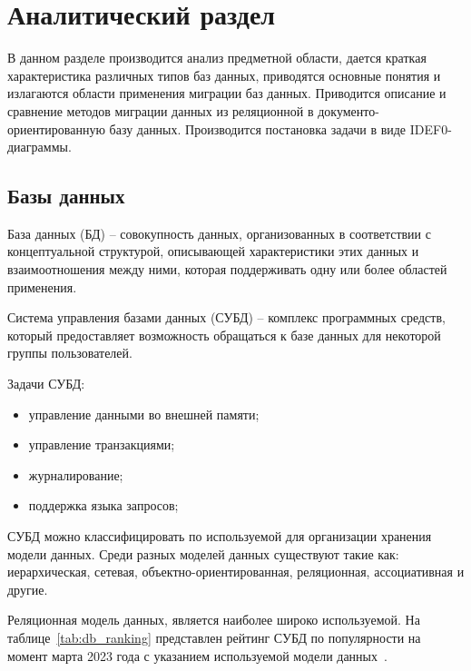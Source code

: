 \chapter{Аналитический раздел}

В данном разделе производится анализ предметной области, 
дается краткая характеристика различных типов баз данных,
приводятся основные понятия и излагаются области применения миграции баз данных. 
Приводится описание и сравнение методов миграции данных 
из реляционной в документо-ориентированную базу данных. 
Производится постановка задачи в виде IDEF0-диаграммы.


\section{Базы данных}

База данных (БД) -- совокупность данных, организованных в соответствии
с концептуальной структурой, описывающей характеристики этих данных и
взаимоотношения между ними, которая поддерживать одну 
или более областей применения.

Система управления базами данных (СУБД) -- комплекс программных средств,
который предоставляет возможность обращаться к базе данных 
для некоторой группы пользователей.
 
Задачи СУБД:
\begin{itemize}[label=---]
    \item управление данными во внешней памяти;
    \item управление транзакциями;
    \item журналирование;
    \item поддержка языка запросов;
\end{itemize}

СУБД можно классифицировать по используемой для организации хранения модели данных.
Среди разных моделей данных существуют такие как:
иерархическая, сетевая, объектно-ориентированная, реляционная, ассоциативная и другие.

Реляционная модель данных, является наиболее широко используемой.
На таблице~\ref{tab:db_ranking} представлен рейтинг СУБД по популярности на момент
марта 2023 года с указанием используемой модели данных~\cite{db_rating}.

\clearpage

